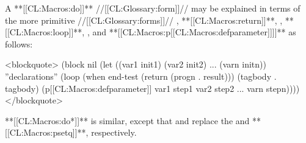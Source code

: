 A **[[CL:Macros:do]]** //[[CL:Glossary:form]]// may be explained in terms of the more primitive //[[CL:Glossary:forms]]// , **[[CL:Macros:return]]**, , **[[CL:Macros:loop]]**, , and **[[CL:Macros:p[[CL:Macros:defparameter]]]]** as follows:

<blockquote> (block nil (let ((var1 init1) (var2 init2) ... (varn initn)) ''declarations'' (loop (when end-test (return (progn . result))) (tagbody . tagbody) (p[[CL:Macros:defparameter]] var1 step1 var2 step2 ... varn stepn)))) </blockquote>

**[[CL:Macros:do*]]** is similar, except that  and  replace the  and **[[CL:Macros:psetq]]**, respectively.

 
